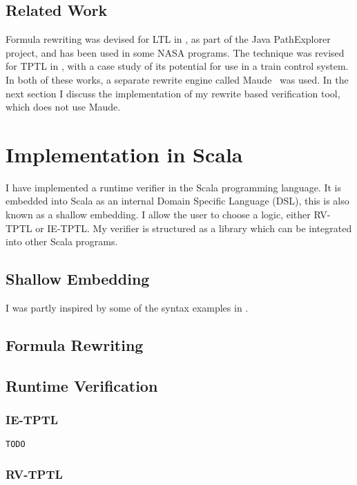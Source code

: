 \documentclass[a4paper]{article}
\begin{document}
\subsection{Related Work}
Formula rewriting was devised for LTL in \textcite{rosu2005rewriting}, as part of the Java PathExplorer project, and has been used in some NASA programs. The technique was revised for TPTL in \textcite{chai2013rewriting}, with a case study of its potential for use in a train control system. In both of these works, a separate rewrite engine called Maude~\autocite{clavel2002maude} was used. In the next section I discuss the implementation of my rewrite based verification tool, which does not use Maude.

\section{Implementation in Scala}\label{implementaion}
I have implemented a runtime verifier in the Scala programming language.
It is embedded into Scala as an internal Domain Specific Language (DSL), this is also known as a shallow embedding.
I allow the user to choose a logic, either RV-TPTL or IE-TPTL.
My verifier is structured as a library which can be integrated into other Scala programs.
\subsection{Shallow Embedding}
I was partly inspired by some of the syntax examples in \textcite{barringer2011tracecontract}.
\subsection{Formula Rewriting}
\subsection{Runtime Verification}

\subsubsection{IE-TPTL}

\begin{lstlisting}[caption={Finalise method for IE-TPTL}]
TODO
\end{lstlisting}
\subsubsection{RV-TPTL}
\end{document}
